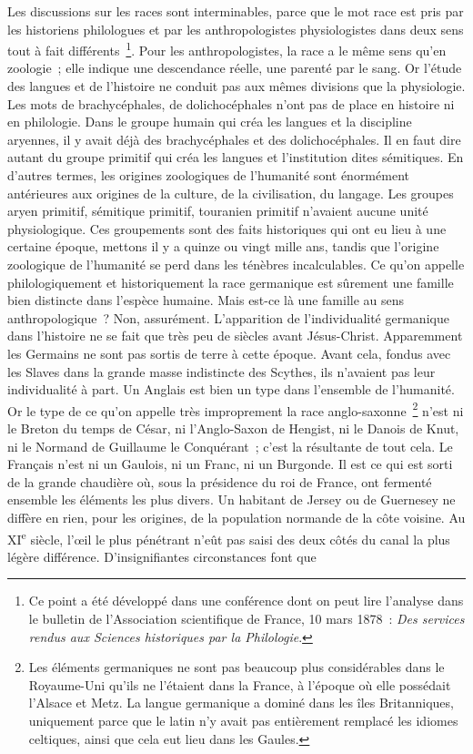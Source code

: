 \documentclass[twoside]{book} %
\newcommand\orgName[1]{#1}
\newcommand\persName[1]{#1}
\newcommand\placeName[1]{#1}
\begin{document}
Les discussions sur les races sont interminables, parce que le mot race est pris par les historiens philologues et par les anthropologistes physiologistes dans deux sens tout à fait différents \footnote{Ce point a été développé dans une conférence dont on peut lire l’analyse dans le bulletin de l’Association scientifique de {\placeName France}, 10 mars 1878 : \emph{Des services rendus aux Sciences historiques par la Philologie}.}. Pour les anthropologistes, la race a le même sens qu’en zoologie ; elle indique une descendance réelle, une parenté par le sang. Or l’étude des langues et de l’histoire ne conduit pas aux mêmes divisions que la physiologie. Les mots de brachycéphales, de dolichocéphales n’ont pas de place en histoire ni en philologie. Dans le groupe humain qui créa les langues et la discipline aryennes, il y avait déjà des brachycéphales et des dolichocéphales. Il en faut dire autant du groupe primitif qui créa les langues et l’institution dites sémitiques. En d’autres termes, les origines zoologiques de l’humanité sont énormément antérieures aux origines de la culture, de la civilisation, du langage. Les groupes aryen primitif, sémitique primitif, touranien primitif n’avaient aucune unité physiologique. Ces groupements sont des faits historiques qui ont eu lieu à une certaine époque, mettons il y a quinze ou vingt mille ans, tandis que l’origine zoologique de l’humanité se perd dans les ténèbres incalculables. Ce qu’on appelle philologiquement et historiquement la race germanique est sûrement une famille bien distincte dans l’espèce humaine. Mais est-ce là une famille au sens anthropologique ? Non, assurément. L’apparition de l’individualité germanique dans l’histoire ne se fait que très peu de siècles avant {\persName Jésus-Christ}. Apparemment les {\orgName Germains} ne sont pas sortis de terre à cette époque. Avant cela, fondus avec les {\orgName Slaves} dans la grande masse indistincte des {\orgName Scythes}, ils n’avaient pas leur individualité à part. Un Anglais est bien un type dans l’ensemble de l’humanité. Or le type de ce qu’on appelle très improprement la race anglo-saxonne \footnote{Les éléments germaniques ne sont pas beaucoup plus considérables dans le {\placeName Royaume-Uni} qu’ils ne l’étaient dans la {\placeName France}, à l’époque où elle possédait l’{\placeName Alsace} et {\placeName Metz}. La langue germanique a dominé dans les {\placeName îles Britanniques}, uniquement parce que le latin n’y avait pas entièrement remplacé les idiomes celtiques, ainsi que cela eut lieu dans les {\placeName Gaules}.} n’est ni le Breton du temps de {\persName César}, ni l’Anglo-Saxon de {\persName Hengist}, ni le Danois de {\persName Knut}, ni le Normand de {\persName Guillaume le Conquérant} ; c’est la résultante de tout cela. Le Français n’est ni un Gaulois, ni un Franc, ni un Burgonde. Il est ce qui est sorti de la grande chaudière où, sous la présidence du {\persName roi de France}, ont fermenté ensemble les éléments les plus divers. Un habitant de {\placeName Jersey} ou de {\placeName Guernesey} ne diffère en rien, pour les origines, de la {\orgName population normande} de la côte voisine. Au XI\textsuperscript{e} siècle, l’œil le plus pénétrant n’eût pas saisi des deux côtés du canal la plus légère différence. D’insignifiantes circonstances font que 
\end{document}
